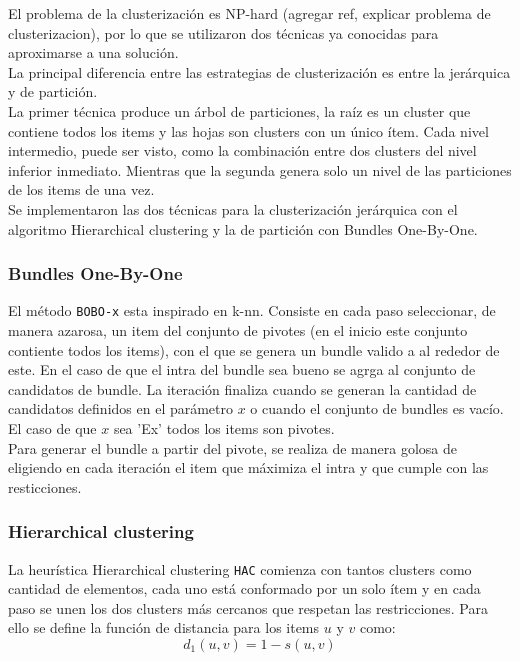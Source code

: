 El problema de la clusterización es NP-hard (agregar ref, explicar problema de clusterizacion),
por lo que se utilizaron dos técnicas ya conocidas para aproximarse a una solución.\\
La principal diferencia entre las estrategias de clusterización es entre la jerárquica y de 
partición.\\
La primer técnica produce un árbol de particiones, la raíz es un cluster que contiene todos los items
y las hojas son clusters con un único ítem. Cada nivel intermedio, puede ser visto, como la 
combinación entre dos clusters del nivel inferior inmediato. Mientras que la segunda genera solo un 
nivel de las particiones de los items de una vez.\\ 
Se implementaron las dos técnicas para la clusterización jerárquica con el algoritmo
Hierarchical clustering y la de partición con Bundles One-By-One.\\

\subsubsection{Bundles One-By-One}
El método \texttt{BOBO-x} esta inspirado en k-nn. Consiste en cada paso seleccionar, de manera azarosa, un item del conjunto de pivotes (en el inicio este conjunto contiente todos los items),
con el que se genera un bundle valido a al rededor de este. En el caso de que el intra del bundle sea bueno se agrga al conjunto de candidatos de bundle.
La iteración finaliza cuando se generan la cantidad de candidatos definidos en el parámetro $x$ o cuando el conjunto de bundles es vacío. El caso de que $x$ sea 'Ex' todos los 
items son pivotes.\\
Para generar el bundle a partir del pivote, se realiza de manera golosa de eligiendo en cada iteración el item que
máximiza el intra y que cumple con las resticciones.\\
\subsubsection{Hierarchical clustering}
La heurística Hierarchical clustering \texttt{HAC} comienza con tantos clusters como cantidad de elementos, cada uno está 
conformado por un solo ítem y en cada paso se unen los dos clusters más cercanos que respetan las restricciones. 
Para ello se define la función de distancia para los items $u$ y $v$ como:\\
\begin{equation}
d_{1}(u,v) = 1 - s(u, v)
\end{equation}


